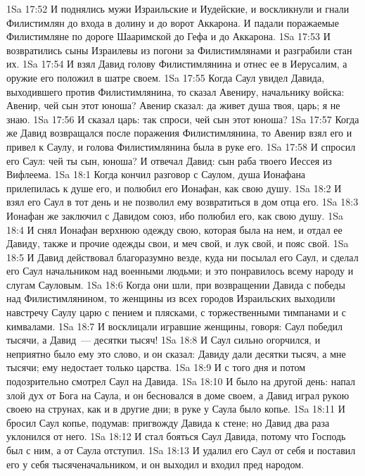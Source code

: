 \vs 1Sa 17:52 И поднялись мужи Израильские и Иудейские, и воскликнули и гнали Филистимлян до входа в долину и до ворот Аккарона. И падали поражаемые Филистимляне по дороге Шааримской до Гефа и до Аккарона.
\vs 1Sa 17:53 И возвратились сыны Израилевы из погони за Филистимлянами и разграбили стан их.
\vs 1Sa 17:54 И взял Давид голову Филистимлянина и отнес ее в Иерусалим, а оружие его положил в шатре своем.
\vs 1Sa 17:55 Когда Саул увидел Давида, выходившего против Филистимлянина, то сказал Авениру, начальнику войска: Авенир, чей сын этот юноша? Авенир сказал: да живет душа твоя, царь; я не знаю.
\vs 1Sa 17:56 И сказал царь: так спроси, чей сын этот юноша?
\vs 1Sa 17:57 Когда же Давид возвращался после поражения Филистимлянина, то Авенир взял его и привел к Саулу, и голова Филистимлянина была в руке его.
\vs 1Sa 17:58 И спросил его Саул: чей ты сын, юноша? И отвечал Давид: сын раба твоего Иессея из Вифлеема.
\vs 1Sa 18:1 Когда кончил  разговор с Саулом, душа Ионафана прилепилась к душе его, и полюбил его Ионафан, как свою душу.
\vs 1Sa 18:2 И взял его Саул в тот день и не позволил ему возвратиться в дом отца его.
\vs 1Sa 18:3 Ионафан же заключил с Давидом союз, ибо полюбил его, как свою душу.
\vs 1Sa 18:4 И снял Ионафан верхнюю одежду свою, которая была на нем, и отдал ее Давиду, также и прочие одежды свои, и меч свой, и лук свой, и пояс свой.
\rsbpar\vs 1Sa 18:5 И Давид действовал благоразумно везде, куда ни посылал его Саул, и сделал его Саул начальником над военными людьми; и это понравилось всему народу и слугам Сауловым.
\vs 1Sa 18:6 Когда они шли, при возвращении Давида с победы над Филистимлянином, то женщины из всех городов Израильских выходили навстречу Саулу царю с пением и плясками, с торжественными тимпанами и с кимвалами.
\vs 1Sa 18:7 И восклицали игравшие женщины, говоря: Саул победил тысячи, а Давид~--- десятки тысяч!
\vs 1Sa 18:8 И Саул сильно огорчился, и неприятно было ему это слово, и он сказал: Давиду дали десятки тысяч, а мне тысячи; ему недостает только царства.
\vs 1Sa 18:9 И с того дня и потом подозрительно смотрел Саул на Давида.
\vs 1Sa 18:10 И было на другой день: напал злой дух от Бога на Саула, и он бесновался в доме своем, а Давид играл рукою своею на струнах, как и в другие дни; в руке у Саула было копье.
\vs 1Sa 18:11 И бросил Саул копье, подумав: пригвожду Давида к стене; но Давид два раза уклонился от него.
\vs 1Sa 18:12 И стал бояться Саул Давида, потому что Господь был с ним, а от Саула отступил.
\vs 1Sa 18:13 И удалил его Саул от себя и поставил его у себя тысяченачальником, и он выходил и входил пред народом.
